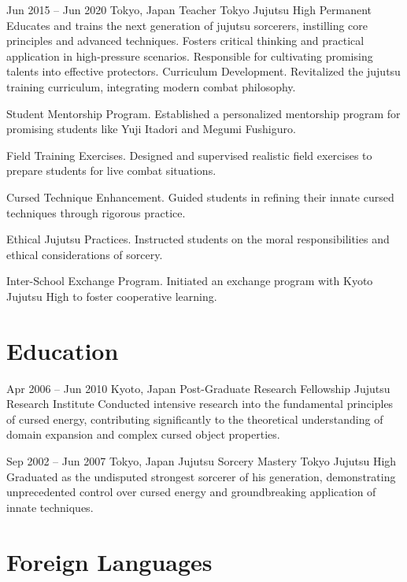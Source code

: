 \documentclass[roman,11pt]{moderncv}
\begin{document}
\cventry
{Jun 2015 -- Jun 2020}
{Tokyo, Japan}
{Teacher}
{Tokyo Jujutsu High}
{Permanent}
{Educates and trains the next generation of jujutsu sorcerers, instilling core principles and advanced techniques. Fosters critical thinking and practical application in high-pressure scenarios. Responsible for cultivating promising talents into effective protectors.}
\cvlistitem
{Curriculum Development. Revitalized the jujutsu training curriculum, integrating modern combat philosophy.}

\cvlistitem
{Student Mentorship Program. Established a personalized mentorship program for promising students like Yuji Itadori and Megumi Fushiguro.}

\cvlistitem
{Field Training Exercises. Designed and supervised realistic field exercises to prepare students for live combat situations.}

\cvlistitem
{Cursed Technique Enhancement. Guided students in refining their innate cursed techniques through rigorous practice.}

\cvlistitem
{Ethical Jujutsu Practices. Instructed students on the moral responsibilities and ethical considerations of sorcery.}

\cvlistitem
{Inter-School Exchange Program. Initiated an exchange program with Kyoto Jujutsu High to foster cooperative learning.}

\section{\faGraduationCap{} Education}

\cventry
{Apr 2006 -- Jun 2010}
{Kyoto, Japan}
{Post-Graduate Research Fellowship}
{Jujutsu Research Institute}
{}
{Conducted intensive research into the fundamental principles of cursed energy, contributing significantly to the theoretical understanding of domain expansion and complex cursed object properties.}

\cventry
{Sep 2002 -- Jun 2007}
{Tokyo, Japan}
{Jujutsu Sorcery Mastery}
{Tokyo Jujutsu High}
{}
{Graduated as the undisputed strongest sorcerer of his generation, demonstrating unprecedented control over cursed energy and groundbreaking application of innate techniques.}

\section{\faLanguage{} Foreign Languages}



\end{document}
